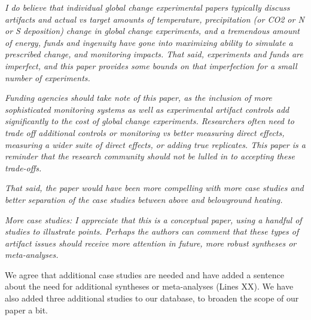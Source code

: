 \documentclass[11pt,a4paper]{letter}
\begin{document}
\begin{letter}{}
\par \emph{I do believe that individual global change experimental papers typically discuss artifacts and actual vs target amounts of temperature, precipitation (or CO2 or N or S deposition) change in global change experiments, and a  tremendous amount of energy, funds and ingenuity have gone into maximizing ability to simulate a prescribed change, and monitoring impacts.  That said, experiments and funds are imperfect, and this paper provides some bounds on that imperfection for a small number of experiments.}

\par \emph{Funding agencies should take note of this paper, as the inclusion of more sophisticated monitoring systems as well as experimental artifact controls add significantly to the cost of global change experiments.  Researchers often need to trade off additional controls or monitoring vs better measuring direct effects, measuring a wider suite of direct effects, or adding true replicates.  This paper is a reminder that the research community should not be lulled in to accepting these trade-offs.}

\par \emph{That said, the paper would have been more compelling with more case studies and better separation of the case studies between above and belowground heating.}

\par \emph{More case studies:  I appreciate that this is a conceptual paper, using a handful of studies to illustrate points.  Perhaps the authors can comment that these types of artifact issues should receive more attention in future, more robust syntheses or meta-analyses.}
\par We agree that additional case studies are needed and have added a sentence about the need for additional syntheses or meta-analyses (Lines XX). We have also added three additional studies to our database, to broaden the scope of our paper a bit.  


\end{letter}
\end{document}

